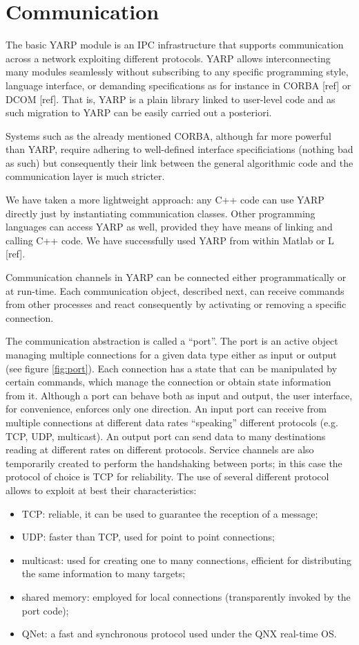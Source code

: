 \section{Communication}

The basic YARP module is an IPC infrastructure that supports communication across a
network exploiting different protocols. YARP allows interconnecting many modules
seamlessly without subscribing to any specific programming style, language interface, 
or demanding specifications as for instance in CORBA [ref] or DCOM [ref]. That is, YARP 
is a plain library linked to user-level code and as such migration to YARP can be easily
carried out a posteriori. 

Systems such as the already mentioned CORBA, although far more powerful than YARP, require 
adhering to well-defined interface specificiations (nothing bad as such) but consequently 
their link between the general algorithmic code and the communication layer is much 
stricter. 

We have taken a more lightweight approach: any C++ code can use YARP directly just by 
instantiating communication classes. Other programming languages can access YARP as well, 
provided they have means of linking and calling C++ code. We have successfully used YARP 
from within Matlab or L [ref].

Communication channels in YARP can be connected either programmatically or at run-time.
Each communication object, described next, can receive commands from other processes and 
react consequently by activating or removing a specific connection.

The communication abstraction is called a ``port''. The port is an active object managing
multiple connections for a given data type either as input or output (see figure \ref{fig:port}). Each connection has
a state that can be manipulated by certain commands, which manage the connection or obtain
state information from it. Although a port can behave both as input and output, the 
user interface, for convenience, enforces only one direction. An input port can receive 
from multiple connections at different data rates ``speaking'' different protocols
(e.g. TCP, UDP, multicast). An output port can send data to many destinations reading at
different rates on different protocols. Service channels are also temporarily created to
perform the handshaking between ports; in this case the protocol of choice is TCP for
reliability. The use of several different protocol allows to exploit at best their 
characteristics:
\begin{itemize}
	\item TCP: reliable, it can be used to guarantee the reception of a message;
	\item UDP: faster than TCP, used for point to point connections;
	\item multicast: used for creating one to many connections, efficient for distributing
	the same information to many targets;
	\item shared memory: employed for local connections (transparently invoked by the port
	code);
	\item QNet: a fast and synchronous protocol used under the QNX real-time OS.
\end{itemize}

